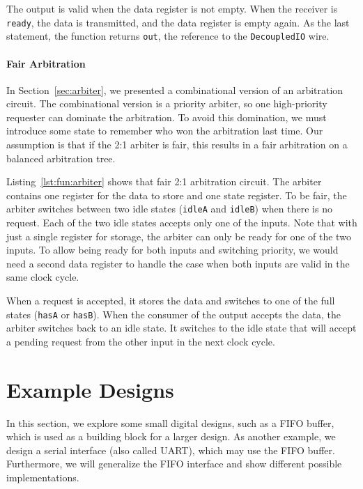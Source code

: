 \documentclass[%
    10pt,
    headinclude, footinclude=false,
    openright, %
    notitlepage,
    cleardoublepage=empty,
    headsepline,
    numbers=noenddot,
    bibliography=totoc, index=totoc,
    ]{scrbook}
\newcommand{\code}[1]{{\lstinline[basicstyle=\small\ttfamily]{#1}}}
\begin{document}
The output is valid when the data register is not empty. When the receiver is \code{ready},
the data is transmitted, and the data register is empty again.
As the last statement, the function returns \code{out}, the reference to the \code{DecoupledIO}
wire.


\subsubsection{Fair Arbitration}

In Section~\ref{sec:arbiter}, we presented a combinational version of an arbitration circuit.
The combinational version is a priority arbiter, so one high-priority requester can
dominate the arbitration.
To avoid this domination, we must introduce some state to remember who won the arbitration last time.
Our assumption is that if the 2:1 arbiter is fair, this results in a fair
arbitration on a balanced arbitration tree.


Listing~\ref{lst:fun:arbiter} shows that fair 2:1 arbitration circuit.
The arbiter contains one register for the data to store and one state register. To be fair, the arbiter
switches between two idle states (\code{idleA} and \code{idleB}) when there is no request.
Each of the two idle states accepts only one of the inputs. Note that with just a single register for
storage, the arbiter can only be ready for one of the two inputs. To allow being ready for both inputs
and switching priority, we would need a second data register to handle the case when both inputs
are valid in the same clock cycle.

When a request is accepted, it stores the data and switches to one of the full states (\code{hasA}
or \code{hasB}).
When the consumer of the output accepts the data, the arbiter switches back to an idle state.
It switches to the idle state that will accept a pending request from the other input
in the next clock cycle.



\chapter{Example Designs}

In this section, we explore some small digital designs, such as
a FIFO buffer, which is used as a building block for a larger design.
As another example, we design a serial interface (also called UART),
which may use the FIFO buffer. Furthermore, we will generalize
the FIFO interface and show different possible implementations.
\end{document}
